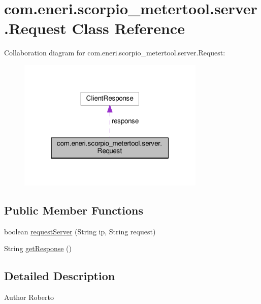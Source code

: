 \hypertarget{classcom_1_1eneri_1_1scorpio__metertool_1_1server_1_1_request}{}\section{com.\+eneri.\+scorpio\+\_\+metertool.\+server.\+Request Class Reference}
\label{classcom_1_1eneri_1_1scorpio__metertool_1_1server_1_1_request}


Collaboration diagram for com.\+eneri.\+scorpio\+\_\+metertool.\+server.\+Request\+:
\nopagebreak
\begin{figure}[H]
\begin{center}
\leavevmode
\includegraphics[width=253pt]{classcom_1_1eneri_1_1scorpio__metertool_1_1server_1_1_request__coll__graph}
\end{center}
\end{figure}
\subsection*{Public Member Functions}
\begin{DoxyCompactItemize}
\item 
boolean \hyperlink{classcom_1_1eneri_1_1scorpio__metertool_1_1server_1_1_request_a426feb23c7745ec6320b7c1b69b6cb0d}{request\+Server} (String ip, String request)
\item 
String \hyperlink{classcom_1_1eneri_1_1scorpio__metertool_1_1server_1_1_request_a3796d5d944e35c1b701996ed02bb372d}{get\+Response} ()
\end{DoxyCompactItemize}


\subsection{Detailed Description}
\begin{DoxyAuthor}{Author}
Roberto 
\end{DoxyAuthor}


